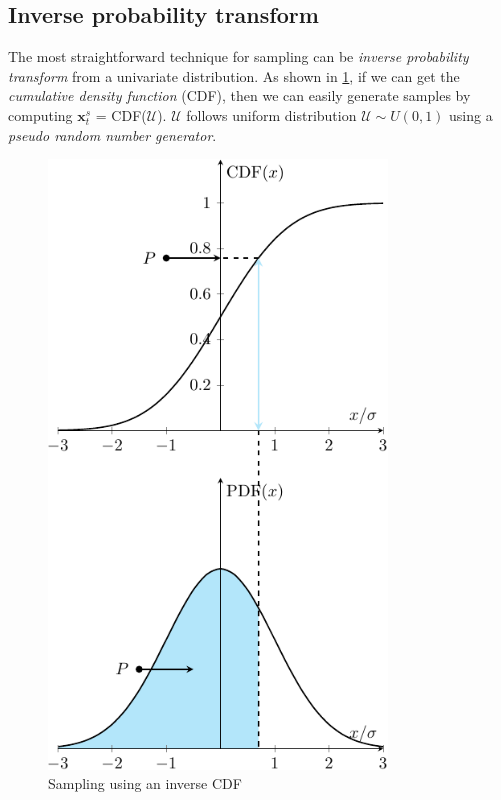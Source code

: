 \subsection{Inverse probability transform}
The most straightforward technique for sampling can be \textit{inverse probability transform} from a univariate distribution. As shown in \cref{fig: CDF}, if we can get the \textit{cumulative density function} (\acrshort{CDF}), then we can easily generate samples by computing $\boldsymbol{x}_{t}^{s}$ = CDF($\mathcal{U}$). $\mathcal{U}$ follows uniform distribution $\mathcal{U} \sim U(0,1)$ using a \textit{pseudo random number generator}.
\begin{figure}[ht]
    \centering
    \includegraphics[width = 90mm]{Figures/figure-CDF.pdf}
    \caption{Sampling using an inverse CDF}
    \label{fig: CDF}
\end{figure}
